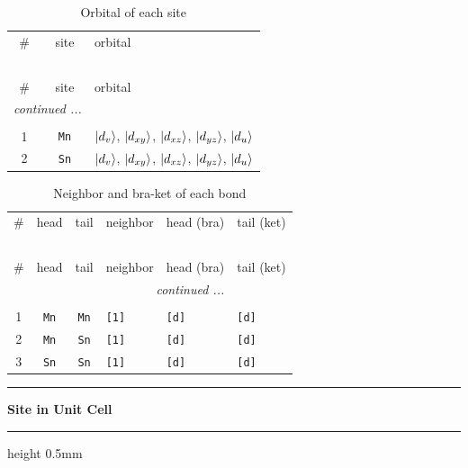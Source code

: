 \documentclass[fleqn,10pt,landscape]{jsarticle}
\begin{document}
\renewcommand{\arraystretch}{1.6}
\begin{longtable}[l]{ccl}
\captionsetup{justification=raggedright, singlelinecheck=off}
\caption{Orbital of each site}
 \\
 \hline \hline
\# & site & orbital \\ \hline \endfirsthead

\multicolumn{2}{l}{\tablename\ \thetable{}} \\
 \hline \hline
\# & site & orbital \\ \hline \endhead

 \hline \hline
\multicolumn{2}{r}{\footnotesize\it continued ...} \\ \endfoot

 \hline \hline
\multicolumn{2}{r}{} \\ \endlastfoot

1 & \texttt{Mn} & $\ket{d_{v}}$, $\ket{d_{xy}}$, $\ket{d_{xz}}$, $\ket{d_{yz}}$, $\ket{d_{u}}$ \\ \hline
2 & \texttt{Sn} & $\ket{d_{v}}$, $\ket{d_{xy}}$, $\ket{d_{xz}}$, $\ket{d_{yz}}$, $\ket{d_{u}}$ \\
\end{longtable}
\renewcommand{\arraystretch}{1.6}
\begin{longtable}[l]{ccclll}
\captionsetup{justification=raggedright, singlelinecheck=off}
\caption{Neighbor and bra-ket of each bond}
 \\
 \hline \hline
\# & head & tail & neighbor & head (bra) & tail (ket) \\ \hline \endfirsthead

\multicolumn{5}{l}{\tablename\ \thetable{}} \\
 \hline \hline
\# & head & tail & neighbor & head (bra) & tail (ket) \\ \hline \endhead

 \hline \hline
\multicolumn{5}{r}{\footnotesize\it continued ...} \\ \endfoot

 \hline \hline
\multicolumn{5}{r}{} \\ \endlastfoot

1 & \texttt{Mn} & \texttt{Mn} & \texttt{[1]} & \texttt{[d]} & \texttt{[d]} \\ \hline
2 & \texttt{Mn} & \texttt{Sn} & \texttt{[1]} & \texttt{[d]} & \texttt{[d]} \\ \hline
3 & \texttt{Sn} & \texttt{Sn} & \texttt{[1]} & \texttt{[d]} & \texttt{[d]} \\
\end{longtable}
\vspace{5mm}
\noindent \rule[0.5mm]{5mm}{0.5mm}\hspace{3mm}\textbf{Site in Unit Cell}\hspace{3mm}\leaders\hrule height 0.5mm\hfill\kern0pt
\vspace{3mm}
\end{document}
